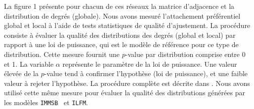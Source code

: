\documentclass[french]{hermes-journal}
\newcommand{\ilfm}{\texttt{ILFM}}
\newcommand{\immsb}{\texttt{IMMSB}}
\begin{document}
La figure 1 présente pour chacun de ces réseaux la matrice d'adjacence et la distribution de degrés (globale). Nous avons mesuré l'attachement préférentiel global et local à l'aide de tests statistiques de qualité d'ajustement. La procédure consiste à évaluer la qualité des distributions des degrés (global et local) par rapport à une loi de puissance, qui est le modèle de référence pour ce type de distribution. Cette mesure fournit une $p$-value par distribution comprise entre 0 et 1. La variable $\alpha$ représente le paramètre de la loi de puissance. Une valeur élevée de la $p$-value tend à confirmer l'hypothèse (loi de puissance), et une faible valeur à rejeter l'hypothèse. La procédure complète est décrite dans \cite{clauset2009power}.
Nous avons utilisé cette même mesure pour évaluer la qualité des distributions générées par les modèles \immsb~ et \ilfm.
\end{document}

